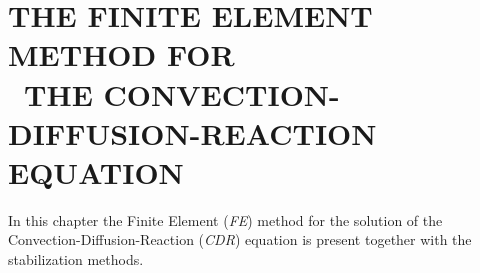 \documentclass[../Dissertation]{subfiles}
\begin{document}

   \chapter[\uppercase{The Finite Element Method for the Convection-Diffusion-Reaction Equation}]{
   \uppercase{The Finite Element Method for\ \protect\\ \ the Convection-Diffusion-Reaction Equation}}
   \label{chp:2}
   
   
   In this chapter the Finite Element (\emph{FE}) method for the solution of the Convection-Diffusion-Reaction (\emph{CDR}) equation is present together with the stabilization methods.
   
   
   
   
   
   
   

   
\end{document}
